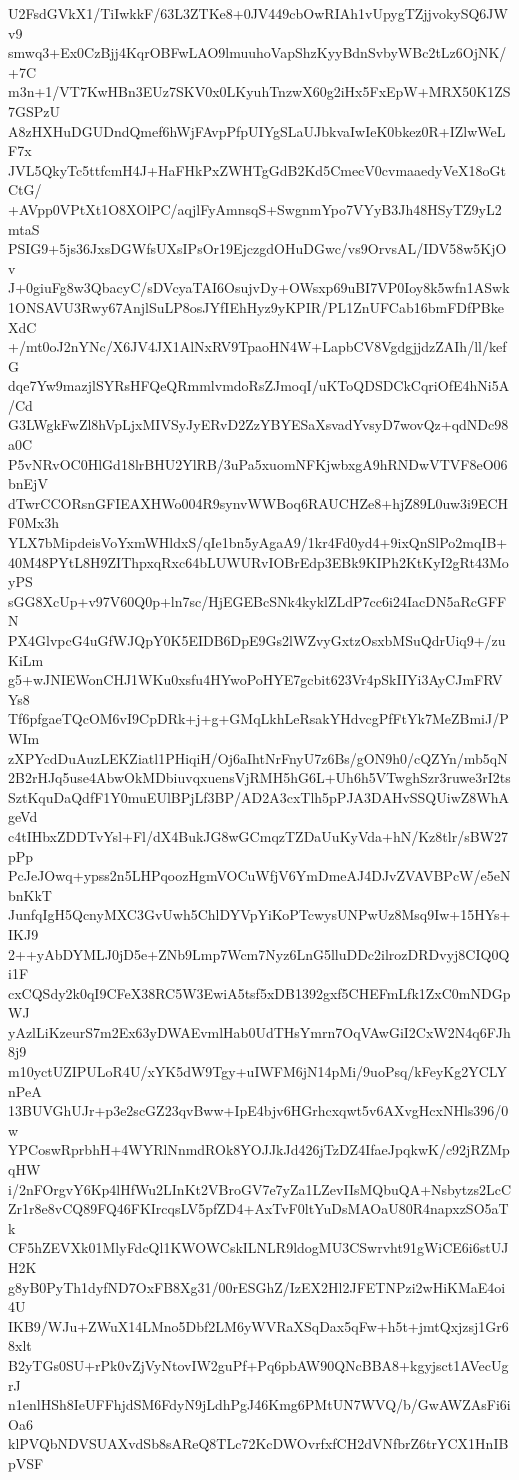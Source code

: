 U2FsdGVkX1/TiIwkkF/63L3ZTKe8+0JV449cbOwRIAh1vUpygTZjjvokySQ6JWv9
smwq3+Ex0CzBjj4KqrOBFwLAO9lmuuhoVapShzKyyBdnSvbyWBc2tLz6OjNK/+7C
m3n+1/VT7KwHBn3EUz7SKV0x0LKyuhTnzwX60g2iHx5FxEpW+MRX50K1ZS7GSPzU
A8zHXHuDGUDndQmef6hWjFAvpPfpUIYgSLaUJbkvaIwIeK0bkez0R+IZlwWeLF7x
JVL5QkyTc5ttfcmH4J+HaFHkPxZWHTgGdB2Kd5CmecV0cvmaaedyVeX18oGtCtG/
+AVpp0VPtXt1O8XOlPC/aqjlFyAmnsqS+SwgnmYpo7VYyB3Jh48HSyTZ9yL2mtaS
PSIG9+5js36JxsDGWfsUXsIPsOr19EjczgdOHuDGwc/vs9OrvsAL/IDV58w5KjOv
J+0giuFg8w3QbacyC/sDVcyaTAI6OsujvDy+OWsxp69uBI7VP0Ioy8k5wfn1ASwk
1ONSAVU3Rwy67AnjlSuLP8osJYfIEhHyz9yKPIR/PL1ZnUFCab16bmFDfPBkeXdC
+/mt0oJ2nYNc/X6JV4JX1AlNxRV9TpaoHN4W+LapbCV8VgdgjjdzZAIh/ll/kefG
dqe7Yw9mazjlSYRsHFQeQRmmlvmdoRsZJmoqI/uKToQDSDCkCqriOfE4hNi5A/Cd
G3LWgkFwZl8hVpLjxMIVSyJyERvD2ZzYBYESaXsvadYvsyD7wovQz+qdNDc98a0C
P5vNRvOC0HlGd18lrBHU2YlRB/3uPa5xuomNFKjwbxgA9hRNDwVTVF8eO06bnEjV
dTwrCCORsnGFIEAXHWo004R9synvWWBoq6RAUCHZe8+hjZ89L0uw3i9ECHF0Mx3h
YLX7bMipdeisVoYxmWHldxS/qIe1bn5yAgaA9/1kr4Fd0yd4+9ixQnSlPo2mqIB+
40M48PYtL8H9ZIThpxqRxc64bLUWURvIOBrEdp3EBk9KIPh2KtKyI2gRt43MoyPS
sGG8XcUp+v97V60Q0p+ln7sc/HjEGEBcSNk4kyklZLdP7cc6i24IacDN5aRcGFFN
PX4GlvpcG4uGfWJQpY0K5EIDB6DpE9Gs2lWZvyGxtzOsxbMSuQdrUiq9+/zuKiLm
g5+wJNIEWonCHJ1WKu0xsfu4HYwoPoHYE7gcbit623Vr4pSkIIYi3AyCJmFRVYs8
Tf6pfgaeTQcOM6vI9CpDRk+j+g+GMqLkhLeRsakYHdvcgPfFtYk7MeZBmiJ/PWIm
zXPYcdDuAuzLEKZiatl1PHiqiH/Oj6aIhtNrFnyU7z6Bs/gON9h0/cQZYn/mb5qN
2B2rHJq5use4AbwOkMDbiuvqxuensVjRMH5hG6L+Uh6h5VTwghSzr3ruwe3rI2ts
SztKquDaQdfF1Y0muEUlBPjLf3BP/AD2A3cxTlh5pPJA3DAHvSSQUiwZ8WhAgeVd
c4tIHbxZDDTvYsl+Fl/dX4BukJG8wGCmqzTZDaUuKyVda+hN/Kz8tlr/sBW27pPp
PcJeJOwq+ypss2n5LHPqoozHgmVOCuWfjV6YmDmeAJ4DJvZVAVBPcW/e5eNbnKkT
JunfqIgH5QcnyMXC3GvUwh5ChlDYVpYiKoPTcwysUNPwUz8Msq9Iw+15HYs+IKJ9
2++yAbDYMLJ0jD5e+ZNb9Lmp7Wcm7Nyz6LnG5lluDDc2ilrozDRDvyj8CIQ0Qi1F
cxCQSdy2k0qI9CFeX38RC5W3EwiA5tsf5xDB1392gxf5CHEFmLfk1ZxC0mNDGpWJ
yAzlLiKzeurS7m2Ex63yDWAEvmlHab0UdTHsYmrn7OqVAwGiI2CxW2N4q6FJh8j9
m10yctUZIPULoR4U/xYK5dW9Tgy+uIWFM6jN14pMi/9uoPsq/kFeyKg2YCLYnPeA
13BUVGhUJr+p3e2scGZ23qvBww+IpE4bjv6HGrhcxqwt5v6AXvgHcxNHls396/0w
YPCoswRprbhH+4WYRlNnmdROk8YOJJkJd426jTzDZ4IfaeJpqkwK/c92jRZMpqHW
i/2nFOrgvY6Kp4lHfWu2LInKt2VBroGV7e7yZa1LZevIIsMQbuQA+Nsbytzs2LcC
Zr1r8e8vCQ89FQ46FKIrcqsLV5pfZD4+AxTvF0ltYuDsMAOaU80R4napxzSO5aTk
CF5hZEVXk01MlyFdcQl1KWOWCskILNLR9ldogMU3CSwrvht91gWiCE6i6stUJH2K
g8yB0PyTh1dyfND7OxFB8Xg31/00rESGhZ/IzEX2Hl2JFETNPzi2wHiKMaE4oi4U
IKB9/WJu+ZWuX14LMno5Dbf2LM6yWVRaXSqDax5qFw+h5t+jmtQxjzsj1Gr68xlt
B2yTGs0SU+rPk0vZjVyNtovIW2guPf+Pq6pbAW90QNcBBA8+kgyjsct1AVecUgrJ
n1enlHSh8IeUFFhjdSM6FdyN9jLdhPgJ46Kmg6PMtUN7WVQ/b/GwAWZAsFi6iOa6
klPVQbNDVSUAXvdSb8sAReQ8TLc72KcDWOvrfxfCH2dVNfbrZ6trYCX1HnIBpVSF

